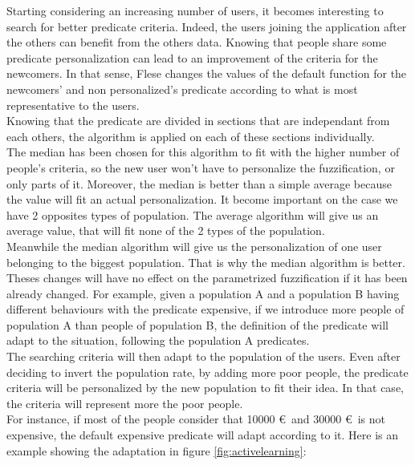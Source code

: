\documentclass[a4paper,twoside]{article}
\begin{document}
Starting considering an increasing number of users, it becomes interesting to search for better predicate criteria. Indeed, the users joining the application after the others can benefit from the others data. Knowing that people share some predicate personalization can lead to an improvement of the criteria for the newcomers. In that sense, Flese changes the values of the default function for the newcomers' and non personalized's predicate according to what is most representative to the users. \\

Knowing that the predicate are divided in sections that are independant from each others, the algorithm is applied on each of these sections individually. \\

The median has been chosen for this algorithm to fit with the higher number of people's criteria, so the new user won't have to personalize the fuzzification, or only parts of it. Moreover, the median is better than a simple average because the value will fit an actual personalization. It become important on the case we have 2 opposites types of population. The average algorithm will give us an average value, that will fit none of the 2 types of the population.\\

Meanwhile the median algorithm will give us the personalization of one user belonging to the biggest population. That is why the median algorithm is better.\\

Theses changes will have no effect on the parametrized fuzzification if it has been already changed. For example, given a population A and a population B having different behaviours with the predicate expensive, if we introduce more people of population A than people of population B, the definition of the predicate will adapt to the situation, following the population A predicates. \\

The searching criteria will then adapt to the population of the users. Even after deciding to invert the population rate, by adding more poor people, the predicate criteria will be personalized by the new population to fit their idea. In that case, the criteria will represent more the poor people. \\

For instance, if most of the people consider that 10000 \euro\  and 30000 \euro\  is not expensive, the default expensive predicate will adapt according to it. Here is an example showing the adaptation in figure \ref{fig:activelearning}:
\end{document}
